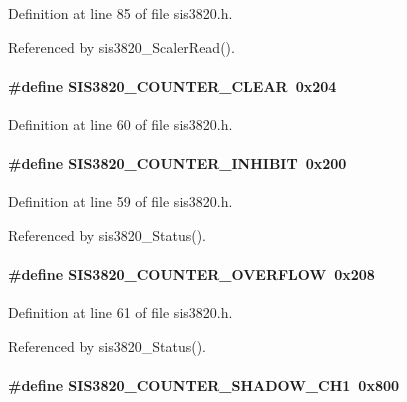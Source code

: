 Definition at line 85 of file sis3820.h.

Referenced by sis3820\_\-ScalerRead().
\paragraph[{SIS3820\_\-COUNTER\_\-CLEAR}]{\setlength{\rightskip}{0pt plus 5cm}\#define SIS3820\_\-COUNTER\_\-CLEAR~0x204}\hfill\label{sis3820_8h_a3d60d17c49ca0252277c51223323c5f7}


Definition at line 60 of file sis3820.h.
\paragraph[{SIS3820\_\-COUNTER\_\-INHIBIT}]{\setlength{\rightskip}{0pt plus 5cm}\#define SIS3820\_\-COUNTER\_\-INHIBIT~0x200}\hfill\label{sis3820_8h_a284f6f4ca8c131442f697e3c296f10da}


Definition at line 59 of file sis3820.h.

Referenced by sis3820\_\-Status().
\paragraph[{SIS3820\_\-COUNTER\_\-OVERFLOW}]{\setlength{\rightskip}{0pt plus 5cm}\#define SIS3820\_\-COUNTER\_\-OVERFLOW~0x208}\hfill\label{sis3820_8h_ac0fdb275bbf0b3132a8f193d39d0a1bb}


Definition at line 61 of file sis3820.h.

Referenced by sis3820\_\-Status().
\paragraph[{SIS3820\_\-COUNTER\_\-SHADOW\_\-CH1}]{\setlength{\rightskip}{0pt plus 5cm}\#define SIS3820\_\-COUNTER\_\-SHADOW\_\-CH1~0x800}\hfill\label{sis3820_8h_a6ee5bf69b5a9511c4acfd0cda823203f}


